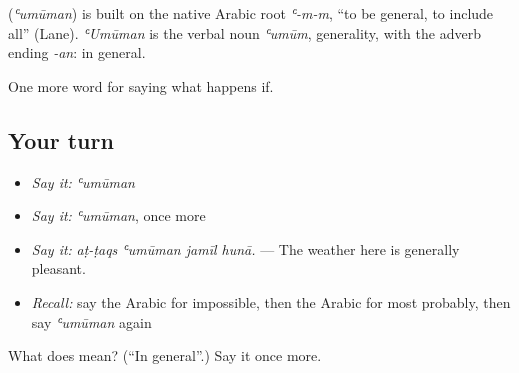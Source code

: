 \begin{cousinweb}
\textbf{} (\emph{ʿumūman}) is built on the native Arabic root \emph{ʿ-m-m}, \textquotedblleft{}to be general, to include all\textquotedblright{} (Lane). \emph{ʿUmūman} is the verbal noun \emph{ʿumūm}, generality, with the adverb ending \emph{-an}: in general.
\end{cousinweb}

\begin{grammarlens}[title={What you've built}]
One more word for saying what happens if.
\end{grammarlens}

\subsection*{Your turn}
\begin{itemize}
\raggedright
  \item \emph{Say it:} \emph{ʿumūman}
  \item \emph{Say it:} \emph{ʿumūman}, once more
  \item \emph{Say it:} \emph{aṭ-ṭaqs ʿumūman jamīl hunā.} — The weather here is generally pleasant.
  \item \emph{Recall:} say the Arabic for impossible, then the Arabic for most probably, then say \emph{ʿumūman} again
\end{itemize}

\begin{tcolorbox}[breakable,colback=teal!4,colframe=teal!35!black,title={Before you move on}]
What does  mean? (\textquotedblleft{}In general\textquotedblright{}.) Say it once more.
\end{tcolorbox}
